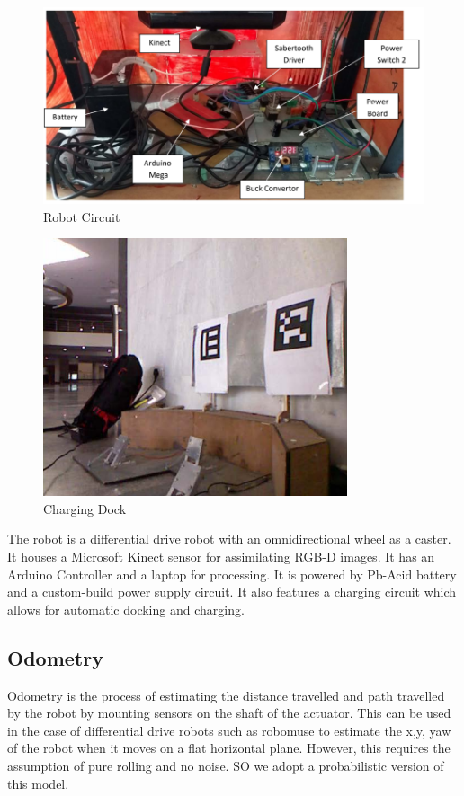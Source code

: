 \documentclass[12pt]{article}
\begin{document}
\begin{figure}[H]
\centering
\includegraphics[scale=0.5]{RobotInterior.PNG}
\caption{Robot Circuit}
\end{figure}

\begin{figure}[H]
\centering
\includegraphics[scale=0.5]{ChargingStand.PNG}
\caption{Charging Dock}
\end{figure}

The robot is a differential drive robot with an omnidirectional wheel as a caster. It houses a Microsoft Kinect sensor for assimilating RGB-D images. It has an Arduino Controller and a laptop for processing. It is powered by Pb-Acid battery and a custom-build power supply circuit. It also features a charging circuit which allows for automatic docking and charging.

\newpage
\subsection{Odometry}
Odometry is the process of estimating the distance travelled and path travelled by the robot by mounting sensors on the shaft of the actuator. This can be used in the case of differential drive robots such as robomuse to estimate the x,y, yaw of the robot when it moves on a flat horizontal plane. However, this requires the assumption of pure rolling and no noise. SO we adopt a probabilistic version of this model.
\end{document}
